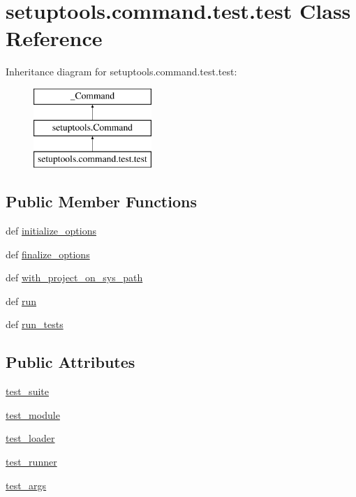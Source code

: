 \hypertarget{classsetuptools_1_1command_1_1test_1_1test}{}\section{setuptools.\+command.\+test.\+test Class Reference}
\label{classsetuptools_1_1command_1_1test_1_1test}
Inheritance diagram for setuptools.\+command.\+test.\+test\+:\begin{figure}[H]
\begin{center}
\leavevmode
\includegraphics[height=3.000000cm]{classsetuptools_1_1command_1_1test_1_1test}
\end{center}
\end{figure}
\subsection*{Public Member Functions}
\begin{DoxyCompactItemize}
\item 
def \hyperlink{classsetuptools_1_1command_1_1test_1_1test_ad4485479d86b388a28c8252029cf9831}{initialize\+\_\+options}
\item 
def \hyperlink{classsetuptools_1_1command_1_1test_1_1test_a34067fee11b6ede8112182ff79efc721}{finalize\+\_\+options}
\item 
def \hyperlink{classsetuptools_1_1command_1_1test_1_1test_a4f2dd3ea4e13075b8d87617e445e24c4}{with\+\_\+project\+\_\+on\+\_\+sys\+\_\+path}
\item 
def \hyperlink{classsetuptools_1_1command_1_1test_1_1test_acceff1f1e6ade7de13f786fc1bbec6c6}{run}
\item 
def \hyperlink{classsetuptools_1_1command_1_1test_1_1test_adc74201229a6b9f486ca606bb41f2fcd}{run\+\_\+tests}
\end{DoxyCompactItemize}
\subsection*{Public Attributes}
\begin{DoxyCompactItemize}
\item 
\hyperlink{classsetuptools_1_1command_1_1test_1_1test_aab9ab12c8acec96fbf5287cf81028c16}{test\+\_\+suite}
\item 
\hyperlink{classsetuptools_1_1command_1_1test_1_1test_ad820e39bc19665bd65fac656db657e60}{test\+\_\+module}
\item 
\hyperlink{classsetuptools_1_1command_1_1test_1_1test_ae12f9aa573e8fc369020284ea5cfb4b8}{test\+\_\+loader}
\item 
\hyperlink{classsetuptools_1_1command_1_1test_1_1test_aca41d56e48dcabf2067540cafc3276d5}{test\+\_\+runner}
\item 
\hyperlink{classsetuptools_1_1command_1_1test_1_1test_a44f1e0d3b9b2061c0b303f9568f1d4b8}{test\+\_\+args}
\end{DoxyCompactItemize}
